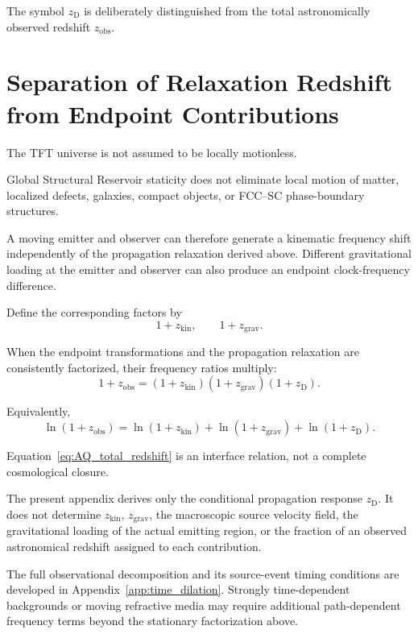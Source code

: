 The symbol $z_{\mathrm D}$ is deliberately distinguished from the total
astronomically observed redshift $z_{\mathrm{obs}}$.


\section{Separation of Relaxation Redshift from Endpoint Contributions}

The TFT universe is not assumed to be locally motionless.

Global Structural Reservoir staticity does not eliminate local motion of
matter, localized defects, galaxies, compact objects, or FCC--SC
phase-boundary structures.

A moving emitter and observer can therefore generate a kinematic frequency
shift independently of the propagation relaxation derived above. Different
gravitational loading at the emitter and observer can also produce an endpoint
clock-frequency difference.

Define the corresponding factors by
\begin{equation}
    1+z_{\mathrm{kin}},
    \qquad
    1+z_{\mathrm{grav}}.
\end{equation}

When the endpoint transformations and the propagation relaxation are
consistently factorized, their frequency ratios multiply:
\begin{equation}
    \boxed{
    1+z_{\mathrm{obs}}
    =
    (1+z_{\mathrm{kin}})
    (1+z_{\mathrm{grav}})
    (1+z_{\mathrm D}).
    }
    \label{eq:AQ_total_redshift}
\end{equation}

Equivalently,
\begin{equation}
    \boxed{
    \ln(1+z_{\mathrm{obs}})
    =
    \ln(1+z_{\mathrm{kin}})
    +
    \ln(1+z_{\mathrm{grav}})
    +
    \ln(1+z_{\mathrm D}).
    }
    \label{eq:AQ_total_redshift_log}
\end{equation}

Equation~\eqref{eq:AQ_total_redshift} is an interface relation, not a complete
cosmological closure.

The present appendix derives only the conditional propagation response
$z_{\mathrm D}$. It does not determine $z_{\mathrm{kin}}$,
$z_{\mathrm{grav}}$, the macroscopic source velocity field, the gravitational
loading of the actual emitting region, or the fraction of an observed
astronomical redshift assigned to each contribution.

The full observational decomposition and its source-event timing conditions
are developed in Appendix~\ref{app:time_dilation}. Strongly time-dependent
backgrounds or moving refractive media may require additional path-dependent
frequency terms beyond the stationary factorization above.


